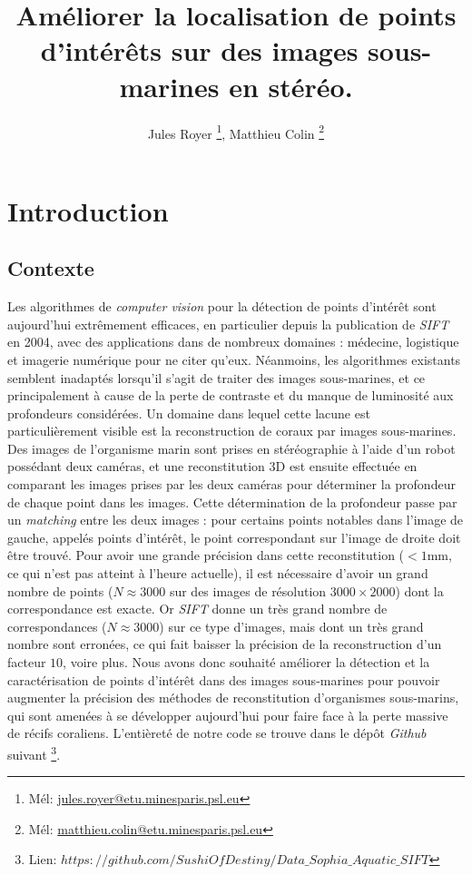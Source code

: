 \documentclass[
	a4paper, %
	10pt, %
	unnumberedsections, %
	twoside, %
]{LTJournalArticle}
\title{Améliorer la localisation de points d'intérêts sur des images sous-marines en stéréo.} %
\author{%
	Jules Royer \thanks{Mél: \href{mailto:jules.royer@etu.minesparis.psl.eu}{jules.royer@etu.minesparis.psl.eu}}, 
	Matthieu Colin \thanks{Mél: \href{mailto:matthieu.colin@etu.minesparis.psl.eu}{matthieu.colin@etu.minesparis.psl.eu}}
}
\begin{document}
\maketitle %


\section{Introduction}

\subsection{Contexte}

Les algorithmes de \textit{computer vision} pour la détection de points d'intérêt sont aujourd'hui extrêmement efficaces, en particulier depuis la publication de \textit{\textit{SIFT}} \autocite{Lowe:2004} en 2004, avec des applications dans de nombreux domaines : médecine, logistique et imagerie numérique pour ne citer qu'eux.
Néanmoins, les algorithmes existants semblent inadaptés lorsqu'il s'agit de traiter des images sous-marines, et ce principalement à cause de la perte de contraste et du manque de luminosité aux profondeurs considérées.
Un domaine dans lequel cette lacune est particulièrement visible est la reconstruction de coraux par images sous-marines. Des images de l'organisme marin sont prises en stéréographie à l'aide d'un robot possédant deux caméras, et une reconstitution 3D est ensuite effectuée en comparant les images prises par les deux caméras pour déterminer la profondeur de chaque point dans les images.
Cette détermination de la profondeur passe par un \textit{matching} entre les deux images : pour certains points notables dans l'image de gauche, appelés points d'intérêt, le point correspondant sur l'image de droite doit être trouvé.
Pour avoir une grande précision dans cette reconstitution ($< 1$mm, ce qui n'est pas atteint à l'heure actuelle), il est nécessaire d'avoir un grand nombre de points ($N \approx 3000$ sur des images de résolution $3000 \times 2000$) dont la correspondance est exacte.
Or \textit{\textit{SIFT}} donne un très grand nombre de correspondances ($N \approx 3000$) sur ce type d'images, mais dont un très grand nombre sont erronées, ce qui fait baisser la précision de la reconstruction d'un facteur $10$, voire plus.
Nous avons donc souhaité améliorer la détection et la caractérisation de points d'intérêt dans des images sous-marines pour pouvoir augmenter la précision des méthodes de reconstitution d'organismes sous-marins, qui sont amenées à se développer aujourd'hui pour faire face à la perte massive de récifs coraliens.
L'entièreté de notre code se trouve dans le dépôt \textit{Github} suivant \footnote{Lien: \href{https://github.com/SushiOfDestiny/Data_Sophia_Aquatic_SIFT}{$https://github.com/SushiOfDestiny/Data\_Sophia\_Aquatic\_SIFT$}}.
\end{document}
